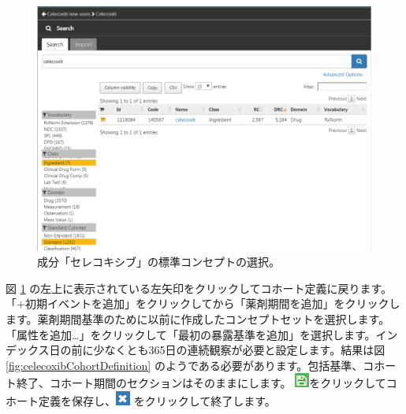 \documentclass[
  11pt]{book}
\theoremstyle{definition}
\theoremstyle{definition}
\theoremstyle{definition}
\theoremstyle{definition}
\theoremstyle{remark}
\begin{document}
\begin{figure}

{\centering \includegraphics[width=1\linewidth]{images/SuggestedAnswers/conceptSearchAtlas} 

}

\caption{成分「セレコキシブ」の標準コンセプトの選択。}\label{fig:conceptSearchAtlas}
\end{figure}

図 \ref{fig:conceptSearchAtlas} の左上に表示されている左矢印をクリックしてコホート定義に戻ります。「+初期イベントを追加」をクリックしてから「薬剤期間を追加」をクリックします。薬剤期間基準のために以前に作成したコンセプトセットを選択します。「属性を追加\ldots」をクリックして「最初の暴露基準を追加」を選択します。インデックス日の前に少なくとも365日の連続観察が必要と設定します。結果は図 \ref{fig:celecoxibCohortDefinition} のようである必要があります。包括基準、コホート終了、コホート期間のセクションはそのままにします。 \includegraphics{images/Cohorts/save.png}をクリックしてコホート定義を保存し、\includegraphics{images/SuggestedAnswers/close.png} をクリックして終了します。
\end{document}
